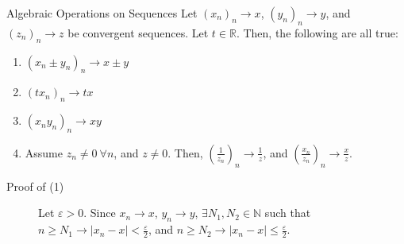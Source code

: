 \documentclass[8pt]{extarticle}
\newcommand{\N}{\mathbb{N}}
\newcommand{\R}{\mathbb{R}}
\begin{document}
  \begin{problem}{Algebraic Operations on Sequences}
    Let $(x_n)_n\rightarrow x$, $(y_n)_n\rightarrow y$, and $(z_n)_n\rightarrow z$ be convergent sequences. Let $t\in\R$. Then, the following are all true:
    \begin{enumerate}[(1)]
      \item $(x_n \pm y_n)_n \rightarrow x\pm y$
      \item $(tx_n)_n \rightarrow tx$
      \item $(x_ny_n)_n \rightarrow xy$
      \item Assume $z_n \neq 0~\forall n$, and $z\neq 0$. Then, $\left(\frac{1}{z_n}\right)_n \rightarrow \frac{1}{z}$, and $\left(\frac{x_n}{z_n}\right)_n \rightarrow \frac{x}{z}$.
    \end{enumerate}
    \tcblower
    \begin{description}
        \item[Proof of (1)] Let $\varepsilon > 0$. Since $x_n \rightarrow x$, $y_n \rightarrow y$, $\exists N_1,N_2\in \N$ such that $n\geq N_1 \rightarrow |x_n - x| < \frac{\varepsilon}{2}$, and $n\geq N_2 \rightarrow |x_n - x| \leq \frac{\varepsilon}{2}$.\\


\end{description}
\end{problem}
\end{document}

